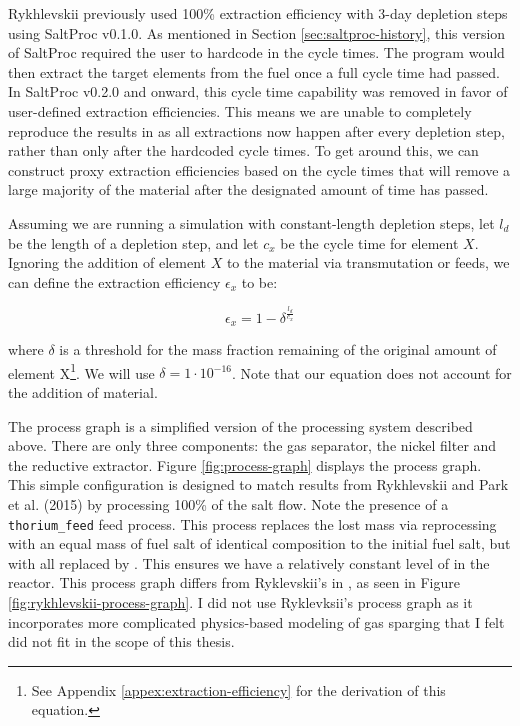 Rykhlevskii previously used 100\% extraction efficiency with 3-day depletion
steps \cite{rykhlevskii_modeling_2019} using SaltProc v0.1.0. As mentioned in
Section \ref{sec:saltproc-history}, this version of SaltProc required the user
to hardcode in the cycle times. The program would then extract the target
elements from the fuel once a full cycle time had passed. In SaltProc v0.2.0 and
onward, this cycle time capability was removed in favor of user-defined
extraction efficiencies. This means we are unable to completely reproduce the
results in \cite{rykhlevskii_modeling_2019} as all extractions now happen after
every depletion step, rather than only after the hardcoded cycle times.
To get around this, we can construct proxy extraction efficiencies based on the
cycle times that will remove a large majority of the material after the
designated amount of time has passed.

Assuming we are running a simulation with constant-length depletion steps, let
$l_{d}$ be the length of a depletion step, and let $c_{x}$ be the cycle time for
element $X$. Ignoring the addition of element $X$ to the material via
transmutation or feeds, we can define the extraction efficiency $\epsilon_{x}$
to be:

\begin{equation}
    \label{eq:extraction-efficiency}
    \epsilon_{x} = 1 - \delta^{\frac{l_{d}}{c_{x}}}
\end{equation}

where $\delta$ is a threshold for the mass fraction remaining of the original
amount of element X\footnote{See Appendix \ref{appex:extraction-efficiency} for
the derivation of this equation.}. We will use $\delta = 1\cdot 10^{-16}$. Note
that our equation does not account for the addition of material.

The process graph is a simplified version of the processing system described 
above. There are only three components: the gas separator, the nickel filter and
the reductive extractor. Figure \ref{fig:process-graph} displays the process
graph. This simple configuration is designed to match results from Rykhlevskii
and Park et al. (2015) \cite{park_whole_2015} by processing 100\% of the salt
flow. Note the presence of a \verb.thorium_feed. feed process. This
process replaces the lost mass via reprocessing with an equal mass of fuel salt
of identical composition to the initial fuel salt, but with all 
replaced by . This ensures we have a relatively constant level of
 in the reactor. This process graph differs from Ryklevskii's
in \cite{rykhlevskii_fuel_2020}, as seen in Figure \ref{fig:rykhlevskii-process-graph}.
I did not use Ryklevksii's process graph as it incorporates more complicated
physics-based modeling of gas sparging that I felt did not fit in the scope
of this thesis.

